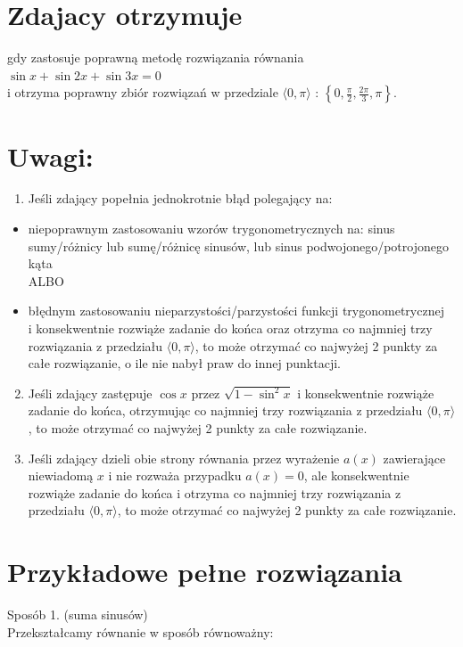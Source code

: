 \documentclass[10pt]{article}
\begin{document}
\section*{Zdajacy otrzymuje}
gdy zastosuje poprawną metodę rozwiązania równania $\sin x+\sin 2 x+\sin 3 x=0$\\
i otrzyma poprawny zbiór rozwiązań w przedziale $\langle 0, \pi\rangle$ : $\left\{0, \frac{\pi}{2}, \frac{2 \pi}{3}, \pi\right\}$.

\section*{Uwagi:}
\begin{enumerate}
  \item Jeśli zdający popełnia jednokrotnie błąd polegający na:
\end{enumerate}

\begin{itemize}
  \item niepoprawnym zastosowaniu wzorów trygonometrycznych na: sinus sumy/różnicy lub sumę/różnicę sinusów, lub sinus podwojonego/potrojonego kąta\\
ALBO
  \item błędnym zastosowaniu nieparzystości/parzystości funkcji trygonometrycznej\\
i konsekwentnie rozwiąże zadanie do końca oraz otrzyma co najmniej trzy rozwiązania z przedziału $\langle 0, \pi\rangle$, to może otrzymać co najwyżej 2 punkty za całe rozwiązanie, o ile nie nabył praw do innej punktacji.
\end{itemize}

\begin{enumerate}
  \setcounter{enumi}{1}
  \item Jeśli zdający zastępuje $\cos x$ przez $\sqrt{1-\sin ^{2} x}$ i konsekwentnie rozwiąże zadanie do końca, otrzymując co najmniej trzy rozwiązania z przedziału $\langle 0, \pi\rangle$, to może otrzymać co najwyżej 2 punkty za całe rozwiązanie.
  \item Jeśli zdający dzieli obie strony równania przez wyrażenie $a(x)$ zawierające niewiadomą $x$ i nie rozważa przypadku $a(x)=0$, ale konsekwentnie rozwiąże zadanie do końca i otrzyma co najmniej trzy rozwiązania z przedziału $\langle 0, \pi\rangle$, to może otrzymać co najwyżej 2 punkty za całe rozwiązanie.
\end{enumerate}

\section*{Przykładowe pełne rozwiązania}
Sposób 1. (suma sinusów)\\
Przekształcamy równanie w sposób równoważny:
\end{document}
